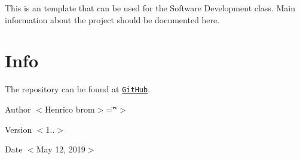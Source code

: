This is an template that can be used for the Software Development class. Main information about the project should be documented here.\hypertarget{index_info}{}\section{Info}\label{index_info}
The repository can be found at \href{https://github.com/vesofton/Software-Ontwikkeling}{\tt Git\+Hub}.

\begin{DoxyAuthor}{Author}
$<$\+Henrico brom$>$=\char`\"{}\char`\"{}$>$ 
\end{DoxyAuthor}
\begin{DoxyVersion}{Version}
$<$1..$>$ 
\end{DoxyVersion}
\begin{DoxyDate}{Date}
$<$May 12, 2019$>$ 
\end{DoxyDate}
